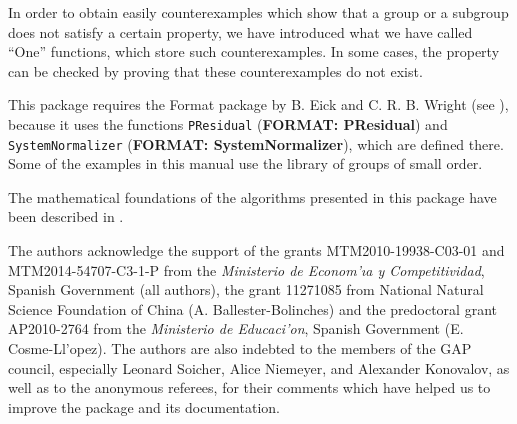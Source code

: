 \documentclass[a4paper,11pt]{report}
\begin{document}
{ In order to obtain easily counterexamples which show that a group or a
subgroup does not satisfy a certain property, we have introduced what we have
called ``One'' functions, which store such counterexamples. In some cases, the property can
be checked by proving that these counterexamples do not exist. 

 This package requires the \textsf{Format} package by B. Eick and C. R. B. Wright (see \cite{EickWright03-FORMAT}), because it uses the functions \texttt{PResidual} (\textbf{FORMAT: PResidual}) and \texttt{SystemNormalizer} (\textbf{FORMAT: SystemNormalizer}), which are defined there. Some of the examples in this manual use the library
of groups of small order. 

 The mathematical foundations of the algorithms presented in this package have
been described in \cite{BallesterCosmeEsteban13-cejm}. 

 The authors acknowledge the support of the grants MTM2010-19938-C03-01 and
MTM2014-54707-C3-1-P from the \emph{Ministerio de Econom{\a'\i}a y Competitividad}, Spanish Government (all authors), the grant 11271085 from National Natural
Science Foundation of China (A. Ballester-Bolinches) and the predoctoral grant
AP2010-2764 from the \emph{Ministerio de Educaci{\a'o}n}, Spanish Government (E. Cosme-Ll{\a'o}pez). The authors are also indebted to
the members of the \textsf{GAP} council, especially Leonard Soicher, Alice Niemeyer, and Alexander Konovalov,
as well as to the anonymous referees, for their comments which have helped us
to improve the package and its documentation. 

 }

 
\end{document}
